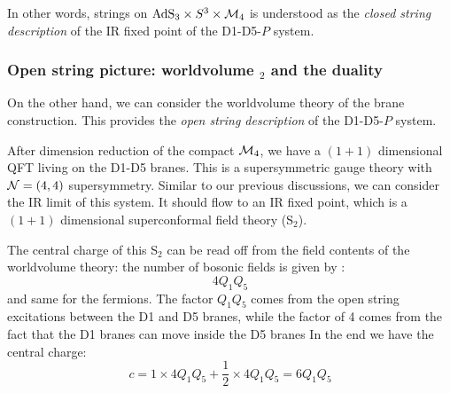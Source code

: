 \documentclass[11pt,a4paper]{article}
\newcommand{\ads}[1]{\text{AdS}\ensuremath{_{#1}}}
\newcommand{\cft}[1]{\text{CFT}\ensuremath{_{#1}}}
\begin{document}
	In other words, strings on $\ads{3}\times S^3\times \mcal{M}_4$ is understood as the \textit{closed string description} of the IR fixed point of the D1-D5-$P$ system. 
	
\subsubsection{Open string picture: worldvolume \cft{2} and the duality}
	
	On the other hand, we can consider the worldvolume theory of the brane construction. This provides the \textit{open string description} of the D1-D5-$P$ system. 
	
	After dimension reduction of the compact $\mathcal{M}_4$, we have a $(1+1)$ dimensional QFT living on the D1-D5 branes. This is a supersymmetric gauge theory with $\mathcal{N} = (4,4)$ supersymmetry. 
	Similar to our previous discussions, we can consider the IR limit of this system. It should flow to an IR fixed point, which is a $(1+1)$ dimensional superconformal field theory (S\cft{2}). 
	
	The central charge of this S\cft{2} can be read off from the field contents of the worldvolume theory: the number of bosonic fields is given by \needcites: 
	\begin{equation}
		4Q_1 Q_5
	\end{equation}
	and same for the fermions. The factor $Q_1 Q_5$ comes from the open string excitations between the D1 and D5 branes, while the factor of 4 comes from the fact that the D1 branes can move inside the D5 branes  In the end we have the central charge:
	\begin{equation}
		c = 1\times 4Q_1 Q_5
			+ \frac{1}{2}\times 4Q_1 Q_5
		= 6Q_1 Q_5
	\end{equation}
	
\end{document}
